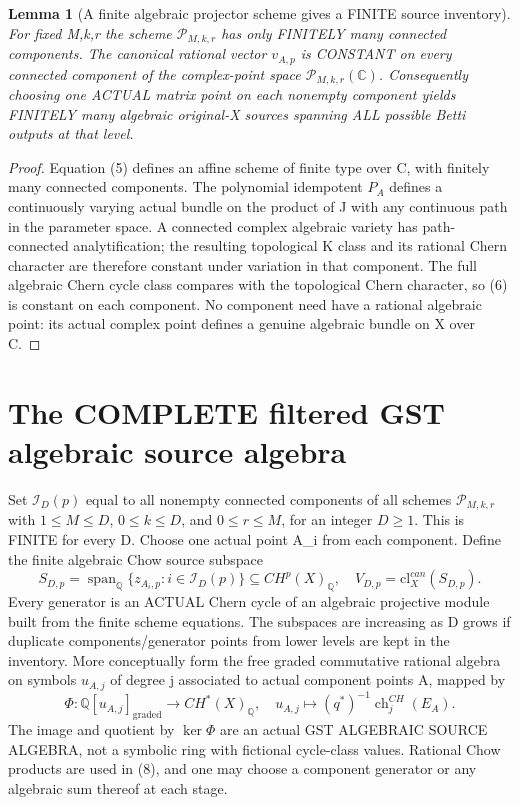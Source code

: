 \documentclass[11pt]{article}
\newtheorem{lemma}[theorem]{Lemma}
\begin{document}
\begin{lemma}[A finite algebraic projector scheme gives a FINITE source inventory]
For fixed M,k,r the scheme \(\mathcal P_{M,k,r}\)
has only FINITELY many connected components.
The canonical rational vector \(v_{A,p}\)
is CONSTANT on every connected component of
the complex-point space \(\mathcal P_{M,k,r}(\mathbb C)\).
Consequently choosing one ACTUAL matrix point on
each nonempty component yields FINITELY many
algebraic original-X sources spanning
ALL possible Betti outputs at that level.
\end{lemma}
\begin{proof}
Equation (5) defines an affine scheme of finite type
over C, with finitely many connected components.
The polynomial idempotent \(P_A\) defines a
continuously varying actual bundle on the product
of J with any continuous path in the parameter
space. A connected complex algebraic variety
has path-connected analytification; the resulting
topological K class and its rational Chern character
are therefore constant under variation in that component.
The full algebraic Chern cycle class compares with
the topological Chern character, so (6) is constant
on each component. No component need have a
rational algebraic point: its actual complex point
defines a genuine algebraic bundle on X over C.
\end{proof}

\section{The COMPLETE filtered GST algebraic source algebra}
Set \(\mathcal I_D(p)\) equal to all nonempty connected
components of all schemes \(\mathcal P_{M,k,r}\)
with \(1\le M\le D\), \(0\le k\le D\),
and \(0\le r\le M\), for an integer \(D\ge1\).
This is FINITE for every D.
Choose one actual point A_i from each component.
Define the finite algebraic Chow source subspace
\[
 \boxed{
 S_{D,p}=\operatorname{span}_{\mathbb Q}
      \{z_{A_i,p}:i\in\mathcal I_D(p)\}
             \subseteq CH^p(X)_{\mathbb Q},
 \quad
 V_{D,p}=\mathrm{cl}^{can}_X(S_{D,p}).
 }                                                     \tag{7}
\]
Every generator is an ACTUAL Chern cycle of an algebraic
projective module built from the finite scheme equations.
The subspaces are increasing as D grows if
duplicate components/generator points from lower levels
are kept in the inventory. More conceptually form
the free graded commutative rational algebra on symbols
\(u_{A,j}\) of degree j associated to actual component
points A, mapped by
\[
 \Phi:\mathbb Q[u_{A,j}]_{\mathrm{graded}}
       \longrightarrow CH^*(X)_{\mathbb Q},
 \quad
 u_{A,j}\longmapsto
   (q^*)^{-1}\operatorname{ch}^{CH}_j(E_A).        \tag{8}
\]
The image and quotient by \(\ker\Phi\)
are an actual GST ALGEBRAIC SOURCE ALGEBRA,
not a symbolic ring with fictional cycle-class values.
Rational Chow products are used in (8), and
one may choose a component generator or any algebraic
sum thereof at each stage.
\end{document}
